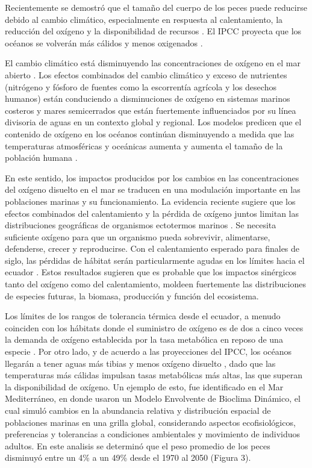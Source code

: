 \documentclass{sydneythesis}
\begin{document}
Recientemente se demostró que el tamaño del cuerpo de los peces puede reducirse debido al cambio climático, especialmente en respuesta al calentamiento, la reducción del oxígeno y la disponibilidad de recursos \autocite{Cheung2013}. El IPCC proyecta que los océanos se volverán más cálidos y menos oxigenados \autocite{IPCC2014}.

El cambio climático está disminuyendo las concentraciones de oxígeno en el mar abierto \autocite{Isensee2016,Deutsch2015}. Los efectos combinados del cambio climático y exceso de nutrientes (nitrógeno y fósforo de fuentes como la escorrentía agrícola y los desechos humanos) están conduciendo a disminuciones de oxígeno en sistemas marinos costeros y mares semicerrados que están fuertemente influenciados por su línea divisoria de aguas en un contexto global y regional. Los modelos predicen que el contenido de oxígeno en los océanos continúan disminuyendo a medida que las temperaturas atmosféricas y oceánicas aumenta y aumenta el tamaño de la población humana \autocite{Isensee2016}.

En este sentido, los impactos producidos por los cambios en las concentraciones del oxígeno disuelto en el mar se traducen en una modulación importante en las poblaciones marinas y su funcionamiento. La evidencia reciente sugiere que los efectos combinados del calentamiento y la pérdida de oxígeno juntos limitan las distribuciones geográficas de organismos ectotermos marinos \autocite{Deutsch2015,Portner2001,Isensee2016}. Se necesita suficiente oxígeno para que un organismo pueda sobrevivir, alimentarse, defenderse, crecer y reproducirse. Con el calentamiento esperado para finales de siglo, las pérdidas de hábitat serán particularmente agudas en los límites hacia el ecuador \autocite{Deutsch2015}. Estos resultados sugieren que es probable que los impactos sinérgicos tanto del oxígeno como del calentamiento, moldeen fuertemente las distribuciones de especies futuras, la biomasa, producción y función del ecosistema.

Los límites de los rangos de tolerancia térmica desde el ecuador, a menudo coinciden con los hábitats donde el suministro de oxígeno es de dos a cinco veces la demanda de oxígeno establecida por la tasa metabólica en reposo de una especie \autocite{Deutsch2015}. Por otro lado, y de acuerdo a las proyecciones del IPCC, los océanos llegarán a tener aguas más tibias y menos oxígeno disuelto \autocite{IPCC2014}, dado que las temperaturas más cálidas impulsan tasas metabólicas más altas, las que superan la disponibilidad de oxígeno. Un ejemplo de esto, fue identificado en el Mar Mediterráneo, en donde \autocite{Cheung2013} usaron un Modelo Envolvente de Bioclima Dinámico, el cual simuló cambios en la abundancia relativa y distribución espacial de poblaciones marinas en una grilla global, considerando aspectos ecofisiológicos, preferencias y tolerancias a condiciones ambientales y movimiento de individuos adultos. En este analisis se determinó que el peso promedio de los peces disminuyó entre un 4\% a un 49\% desde el 1970 al 2050 (Figura 3).
\end{document}
